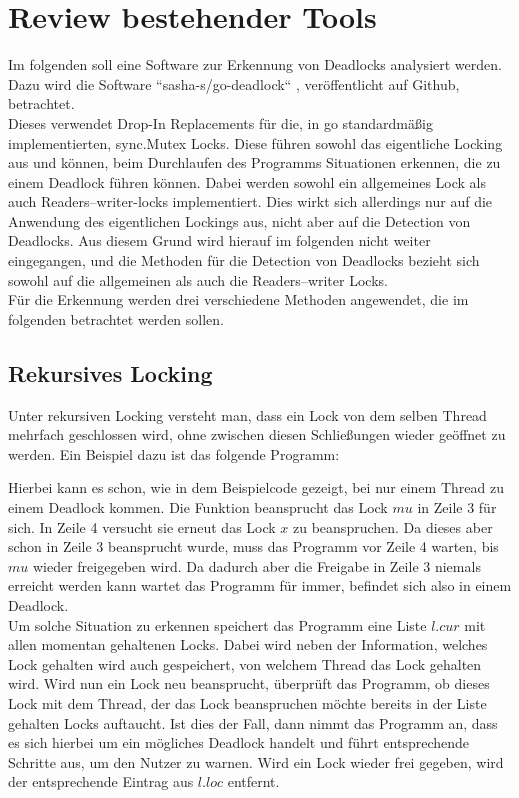 \chapter{Review bestehender Tools}
Im folgenden soll eine Software zur Erkennung von Deadlocks analysiert werden.
Dazu wird die Software ``sasha-s/go-deadlock`` \cite{sasha-s}, veröffentlicht 
auf Github, betrachtet.\\
Dieses verwendet Drop-In Replacements für die, in go standardmäßig 
implementierten, sync.Mutex Locks. Diese führen sowohl das eigentliche 
Locking aus und können, beim Durchlaufen des Programms Situationen erkennen, 
die zu einem Deadlock führen können. Dabei werden sowohl ein allgemeines Lock 
als auch Readers–writer-locks implementiert. Dies wirkt sich allerdings nur auf
die Anwendung des eigentlichen Lockings aus, nicht aber auf die Detection von 
Deadlocks. Aus diesem Grund wird hierauf im folgenden nicht weiter eingegangen, 
und die Methoden für die Detection von Deadlocks bezieht sich sowohl auf die
allgemeinen als auch die Readers–writer Locks.\\
Für die Erkennung werden drei verschiedene Methoden angewendet, die im folgenden
betrachtet werden sollen.
\section{Rekursives Locking}
Unter rekursiven Locking versteht man, dass ein Lock von dem selben Thread 
mehrfach geschlossen wird, ohne zwischen diesen Schließungen wieder geöffnet zu
werden. Ein Beispiel dazu ist das folgende Programm:
\begin{figure}[H]
    
\end{figure}
Hierbei kann es schon, wie in dem Beispielcode gezeigt, bei nur einem Thread
zu einem Deadlock kommen. Die Funktion beansprucht das Lock $mu$ in Zeile $3$ 
für sich. In Zeile 4 versucht sie erneut das Lock $x$ zu beanspruchen. Da dieses
aber schon in Zeile 3 beansprucht wurde, muss das Programm vor Zeile 4 warten, 
bis $mu$ wieder freigegeben wird. Da dadurch aber die Freigabe in Zeile 3 
niemals erreicht werden kann wartet das Programm für immer, befindet sich also 
in einem Deadlock.\\
Um solche Situation zu erkennen speichert das Programm eine Liste $l.cur$ mit 
allen momentan gehaltenen 
Locks. Dabei wird neben der Information, welches Lock gehalten wird auch 
gespeichert, von welchem Thread das Lock gehalten wird. Wird nun ein Lock neu 
beansprucht, überprüft 
das Programm, ob dieses Lock mit dem Thread, der das Lock beanspruchen möchte 
bereits in der Liste gehalten Locks auftaucht. Ist dies der Fall, dann nimmt das
Programm an, dass es sich hierbei um ein mögliches Deadlock handelt und führt 
entsprechende Schritte aus, um den Nutzer zu warnen. Wird ein Lock wieder frei
gegeben, wird der entsprechende Eintrag aus $l.loc$ entfernt.

